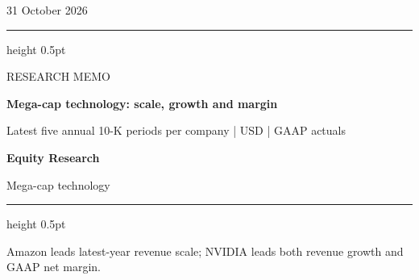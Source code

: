 \documentclass[a4paper,10pt]{article}
\newcommand{\ReportTitle}{Mega-cap technology: scale, growth and margin}
\newcommand{\ReportType}{RESEARCH MEMO}
\newcommand{\ReportDate}{31 October 2026}
\newcommand{\ReportScope}{Latest five annual 10-K periods per company | USD | GAAP actuals}
\newcommand{\TeamName}{Equity Research}
\newcommand{\DeskName}{Mega-cap technology}
\newcommand{\KeyFinding}{Amazon leads latest-year revenue scale; NVIDIA leads both revenue growth and GAAP net margin.}
\begin{document}
\begin{minipage}[t]{0.70\textwidth}
\vspace{0pt}
{\small\ReportDate}\par\medskip
{\color{MemoBlue}\hrule height 0.5pt}\smallskip
{\large\ReportType}\par\smallskip
{\LARGE\bfseries\ReportTitle}\par\medskip
\ReportScope
\end{minipage}\hfill
\begin{minipage}[t]{0.23\textwidth}
\vspace{0pt}\raggedleft
\colorbox{MemoBlue}{\parbox[c][19mm][c]{0.86\linewidth}{\centering\color{white}\bfseries\TeamName}}\par\medskip
\DeskName
\end{minipage}
\par\bigskip
{\color{MemoBlue}\hrule height 0.5pt}\medskip
{\large\KeyFinding}\par\bigskip
\end{document}
